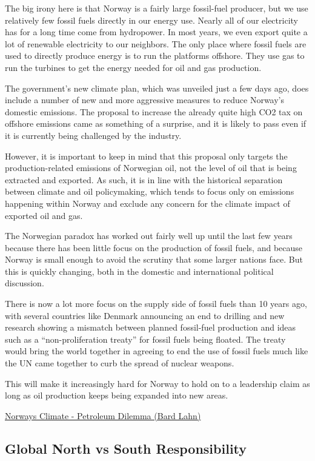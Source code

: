 \documentclass[
]{book}
\begin{document}
The big irony here is that Norway is a fairly large fossil-fuel producer, but we use relatively few fossil fuels directly in our energy use. Nearly all of our electricity has for a long time come from hydropower. In most years, we even export quite a lot of renewable electricity to our neighbors.
The only place where fossil fuels are used to directly produce energy is to run the platforms offshore. They use gas to run the turbines to get the energy needed for oil and gas production.

The government's new climate plan, which was unveiled just a few days ago, does include a number of new and more aggressive measures to reduce Norway's domestic emissions. The proposal to increase the already quite high CO2 tax on offshore emissions came as something of a surprise, and it is likely to pass even if it is currently being challenged by the industry.

However, it is important to keep in mind that this proposal only targets the production-related emissions of Norwegian oil, not the level of oil that is being extracted and exported. As such, it is in line with the historical separation between climate and oil policymaking, which tends to focus only on emissions happening within Norway and exclude any concern for the climate impact of exported oil and gas.

The Norwegian paradox has worked out fairly well up until the last few years because there has been little focus on the production of fossil fuels, and because Norway is small enough to avoid the scrutiny that some larger nations face. But this is quickly changing, both in the domestic and international political discussion.

There is now a lot more focus on the supply side of fossil fuels than 10 years ago, with several countries like Denmark announcing an end to drilling and new research showing a mismatch between planned fossil-fuel production and ideas such as a ``non-proliferation treaty'' for fossil fuels being floated. The treaty would bring the world together in agreeing to end the use of fossil fuels much like the UN came together to curb the spread of nuclear weapons.

This will make it increasingly hard for Norway to hold on to a leadership claim as long as oil production keeps being expanded into new areas.

\href{https://www.vox.com/22227063/norway-oil-gas-climate-change}{Norways Climate - Petroleum Dilemma (Bard Lahn)}

\hypertarget{global-north-vs-south-responsibility}{%
\subsection{Global North vs South Responsibility}\label{global-north-vs-south-responsibility}}
\end{document}
